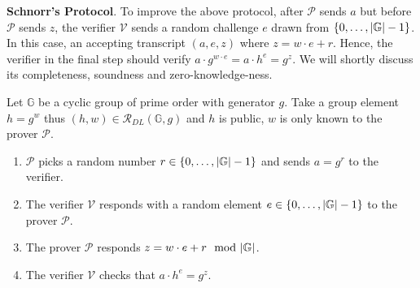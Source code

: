 \documentclass{article}
\begin{document}
\textbf{Schnorr's Protocol}. To improve the above protocol, after $\mathcal{P}$ sends $a$ but before $\mathcal{P}$ sends $z$, the verifier $\mathcal{V}$ sends a random challenge $e$ drawn from $\left\{ 0, \dots, \abs{\mathbb{G}}-1 \right\}$. In this case, an accepting transcript $(a, e, z)$ where $z = w\cdot e + r$. Hence, the verifier in the final step should verify $a \cdot g^{w \cdot e} = a \cdot h^e = g^z$. We will shortly discuss its completeness, soundness and zero-knowledge-ness.

\begin{boxx1} \label{def:schnorr}
Let $\mathbb{G}$ be a cyclic group of prime order with generator $g$. Take a group element $h = g^w$ thus $(h, w) \in \mathcal{R}_{DL}(\mathbb{G}, g)$ and $h$ is public, $w$ is only known to the prover $\mathcal{P}$. 
\begin{enumerate}
\item\label{item:31} $\mathcal{P}$ picks a random number $r \in \left\{ 0, \dots, \abs{\mathbb{G}}-1 \right\}$ and sends $a = g^r$ to the verifier. 
\item\label{item:32} The verifier $\mathcal{V}$ responds with a random element $e \in \left\{ 0, \dots, \abs{\mathbb{G}}-1 \right\}$ to the prover $\mathcal{P}$. 
\item\label{item:33} The prover $\mathcal{P}$ responds $z = w \cdot e + r \mod \abs{\mathbb{G}}$. 
\item\label{item:34} The verifier $\mathcal{V}$ checks that $a \cdot h^e = g^z$.
\end{enumerate}
\end{boxx1}
\end{document}
